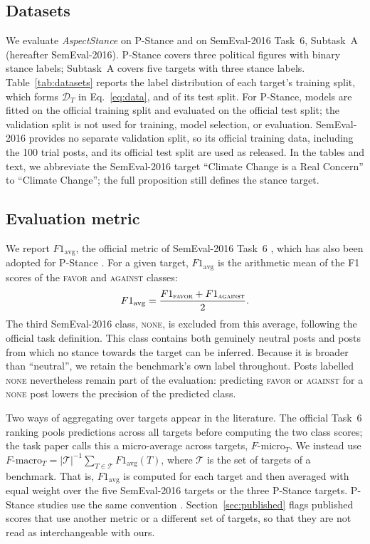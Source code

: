 \documentclass[pdflatex,sn-mathphys-num,iicol]{sn-jnl}%
\begin{document}
\subsection{Datasets}\label{subsec51}
We evaluate \textit{AspectStance} on P-Stance \cite{li2021p} and on SemEval-2016 Task~6, Subtask~A \cite{mohammad2016semeval} (hereafter SemEval-2016). P-Stance covers three political figures with binary stance labels; Subtask~A covers five targets with three stance labels. Table~\ref{tab:datasets} reports the label distribution of each target's training split, which forms \(\mathcal{D}_T\) in Eq.~\eqref{eq:data}, and of its test split. For P-Stance, models are fitted on the official training split and evaluated on the official test split; the validation split is not used for training, model selection, or evaluation. SemEval-2016 provides no separate validation split, so its official training data, including the 100 trial posts, and its official test split are used as released. In the tables and text, we abbreviate the SemEval-2016 target ``Climate Change is a Real Concern'' to ``Climate Change''; the full proposition still defines the stance target.


\subsection{Evaluation metric}\label{subsec52}
We report \(F1_{\mathrm{avg}}\), the official metric of SemEval-2016 Task~6 \cite{mohammad2016semeval}, which has also been adopted for P-Stance \cite{li2021p,li2023distilling}. For a given target, \(F1_{\mathrm{avg}}\) is the arithmetic mean of the F1 scores of the \textsc{favor} and \textsc{against} classes:
\begin{equation}\label{eq:f1avg}
F1_{\mathrm{avg}} = \frac{F1_{\textsc{favor}} + F1_{\textsc{against}}}{2}.
\end{equation}
The third SemEval-2016 class, \textsc{none}, is excluded from this average, following the official task definition. This class contains both genuinely neutral posts and posts from which no stance towards the target can be inferred. Because it is broader than ``neutral'', we retain the benchmark's own label throughout. Posts labelled \textsc{none} nevertheless remain part of the evaluation: predicting \textsc{favor} or \textsc{against} for a \textsc{none} post lowers the precision of the predicted class.

Two ways of aggregating over targets appear in the literature. The official Task~6 ranking pools predictions across all targets before computing the two class scores; the task paper calls this a micro-average across targets, \(F\text{-}\mathrm{micro}_T\). We instead use \(F\text{-}\mathrm{macro}_T = |\mathcal{T}|^{-1}\sum_{T\in\mathcal{T}} F1_{\mathrm{avg}}(T)\), where \(\mathcal{T}\) is the set of targets of a benchmark. That is, \(F1_{\mathrm{avg}}\) is computed for each target and then averaged with equal weight over the five SemEval-2016 targets or the three P-Stance targets. P-Stance studies use the same convention \cite{li2023distilling}. Section~\ref{sec:published} flags published scores that use another metric or a different set of targets, so that they are not read as interchangeable with ours.
\end{document}

